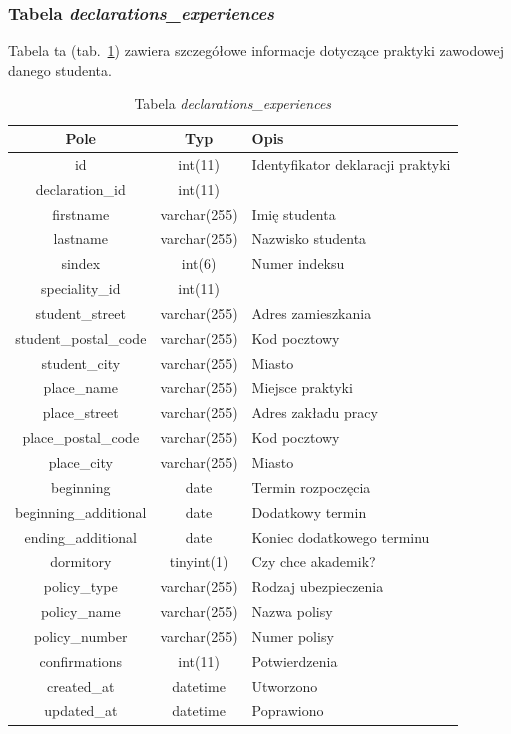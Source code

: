 \documentclass[a4paper,12pt,oneside]{report}
\begin{document}
\newpage
\subsubsection{Tabela \emph{declarations\_experiences}}
\label{subsub:declarations_experiences}
Tabela ta (tab.~\ref{tab:declarations_experiences}) zawiera szczegółowe informacje dotyczące praktyki zawodowej danego studenta.

\begin{table}[h]
  \centering
  \begin{tabular}{|c|c|l|}\hline
  Pole & Typ & Opis \\\hline
  id   & int(11)   & Identyfikator deklaracji praktyki\\
  declaration\_id       & int(11)      & \\
  firstname             & varchar(255) & Imię studenta \\
  lastname              & varchar(255) & Nazwisko studenta \\
  sindex                & int(6)       & Numer indeksu \\
  speciality\_id        & int(11)      & \\
  student\_street       & varchar(255) & Adres zamieszkania \\
  student\_postal\_code & varchar(255) & Kod pocztowy\\
  student\_city         & varchar(255) & Miasto \\
  place\_name           & varchar(255) & Miejsce praktyki \\
  place\_street         & varchar(255) & Adres zakładu pracy \\
  place\_postal\_code   & varchar(255) & Kod pocztowy\\
  place\_city           & varchar(255) & Miasto \\
  beginning             & date         & Termin rozpoczęcia \\
  beginning\_additional & date         & Dodatkowy termin \\
  ending\_additional    & date         & Koniec dodatkowego terminu \\
  dormitory             & tinyint(1)   & Czy chce akademik? \\
  policy\_type          & varchar(255) & Rodzaj ubezpieczenia \\
  policy\_name          & varchar(255) & Nazwa polisy \\
  policy\_number        & varchar(255) & Numer polisy \\
  confirmations         & int(11)      & Potwierdzenia \\
  created\_at           & datetime     & Utworzono \\
  updated\_at           & datetime     & Poprawiono \\\hline
  \end{tabular}
  \caption{Tabela \emph{declarations\_experiences}\label{tab:declarations_experiences}}
\end{table}
\end{document}
